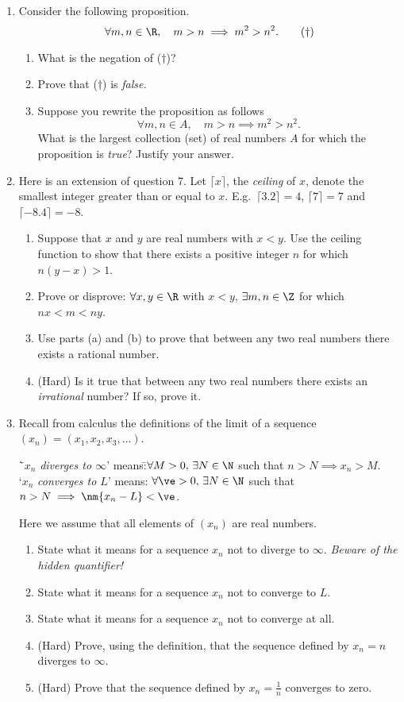 \begin{enumerate}
	  \item Consider the following proposition.
	\[\forall m,n\in\R,\quad m>n\implies m^2>n^2.\tag*{($\dag$)}\]
	\begin{enumerate}
  	\item What is the negation of ($\dag$)?
  	\item Prove that ($\dag$) is \emph{false.}
  	\item Suppose you rewrite the proposition as follows
  	\[\forall m,n\in A,\quad m>n\implies m^2>n^2.\]
  	What is the largest collection (set) of real numbers $A$ for which the proposition is \emph{true}? Justify your answer.
	\end{enumerate}
	
	\item Here is an extension of question 7. Let $\lceil x\rceil$, the \emph{ceiling} of $x$, denote the smallest integer greater than or equal to $x$. E.g.\ $\lceil 3.2\rceil=4$, $\lceil 7\rceil=7$ and $\lceil -8.4\rceil=-8$.
	\begin{enumerate}
  	\item Suppose that $x$ and $y$ are real numbers with $x<y$. Use the ceiling function to show that there exists a positive integer $n$ for which $n(y-x)>1$.
  	\item Prove or disprove: $\forall x,y\in\R$ with $x<y$, $\exists m,n\in\Z$ for which $nx<m<ny$.
  	\item Use parts (a) and (b) to prove that between any two real numbers there exists a rational number.
  	\item (Hard) Is it true that between any two real numbers there exists an \emph{irrational} number? If so, prove it.
	\end{enumerate}
	
	\item Recall from calculus the definitions of the limit of a sequence $(x_n)=(x_1,x_2,x_3,\ldots)$.
	\begin{tabbing}
	  \=`$x_n$ \emph{diverges to $\infty$}' means:\qquad\qquad \=$\forall M>0,\,\exists N\in\N$ such that $n>N\implies x_n>M$.\\[5pt]
	  \>`$x_n$ \emph{converges to $L$}' means: \>$\forall\ve>0,\,\exists N\in\N$ such that $n>N\implies \nm{x_n-L}<\ve$.
	\end{tabbing}
	Here we assume that all elements of $(x_n)$ are real numbers.
	\begin{enumerate}
	  \item State what it means for a sequence $x_n$ not to diverge to $\infty$. \emph{Beware of the hidden quantifier!}
	  \item State what it means for a sequence $x_n$ not to converge to $L$.
	  \item State what it means for a sequence $x_n$ not to converge at all.
	  \item (Hard) Prove, using the definition, that the sequence defined by $x_n=n$ diverges to $\infty$.
	  \item (Hard) Prove that the sequence defined by $x_n=\frac 1n$ converges to zero.
	\end{enumerate}
	

\end{enumerate}
